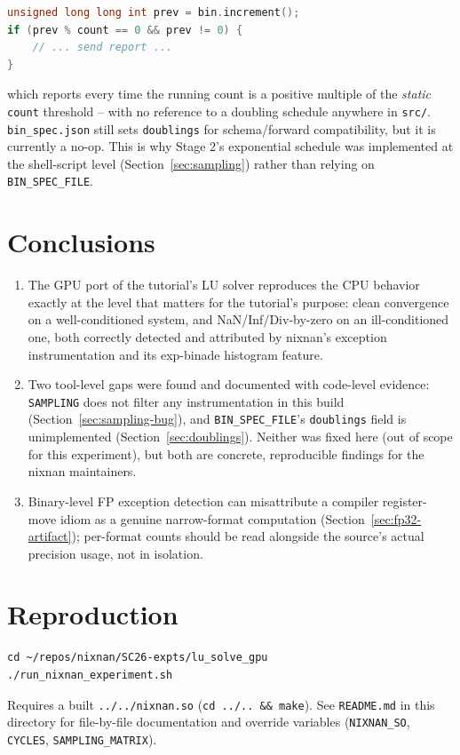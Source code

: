 \documentclass[11pt,a4paper]{article}
\begin{document}
\begin{lstlisting}[language=C++]
unsigned long long int prev = bin.increment();
if (prev % count == 0 && prev != 0) {
    // ... send report ...
}
\end{lstlisting}

which reports every time the running count is a positive multiple of the
\emph{static} \texttt{count} threshold -- with no reference to a doubling
schedule anywhere in \texttt{src/}. \texttt{bin\_spec.json} still sets
\texttt{doublings} for schema/forward compatibility, but it is currently a
no-op. This is why Stage 2's exponential schedule was implemented at the
shell-script level (Section~\ref{sec:sampling}) rather than relying on
\texttt{BIN\_SPEC\_FILE}.

\section{Conclusions}

\begin{enumerate}
  \item The GPU port of the tutorial's LU solver reproduces the CPU
    behavior exactly at the level that matters for the tutorial's purpose:
    clean convergence on a well-conditioned system, and NaN/Inf/Div-by-zero
    on an ill-conditioned one, both correctly detected and attributed by
    nixnan's exception instrumentation and its exp-binade histogram
    feature.
  \item Two tool-level gaps were found and documented with code-level
    evidence: \texttt{SAMPLING} does not filter any instrumentation in this
    build (Section~\ref{sec:sampling-bug}), and \texttt{BIN\_SPEC\_FILE}'s
    \texttt{doublings} field is unimplemented (Section~\ref{sec:doublings}).
    Neither was fixed here (out of scope for this experiment), but both are
    concrete, reproducible findings for the nixnan maintainers.
  \item Binary-level FP exception detection can misattribute a compiler
    register-move idiom as a genuine narrow-format computation
    (Section~\ref{sec:fp32-artifact}); per-format counts should be read
    alongside the source's actual precision usage, not in isolation.
\end{enumerate}

\section*{Reproduction}

\begin{lstlisting}
cd ~/repos/nixnan/SC26-expts/lu_solve_gpu
./run_nixnan_experiment.sh
\end{lstlisting}

\noindent Requires a built \texttt{../../nixnan.so} (\texttt{cd ../.. \&\& make}).
See \texttt{README.md} in this directory for file-by-file documentation and
override variables (\texttt{NIXNAN\_SO}, \texttt{CYCLES},
\texttt{SAMPLING\_MATRIX}).
\end{document}
